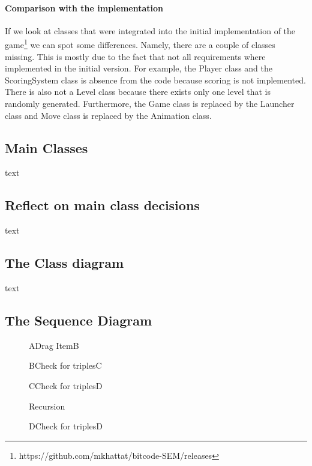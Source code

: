 \documentclass{article}
\begin{document}


\paragraph{Comparison with the implementation} If we look at classes that were integrated into the initial implementation of the game\footnote{https://github.com/mkhattat/bitcode-SEM/releases} we can spot some differences. Namely, there are a couple of classes missing. This is mostly due to the fact that not all requirements where implemented in the initial version. For example, the Player class and the ScoringSystem class is absence from the code because scoring is not implemented. There is also not a Level class because there exists only one level that is randomly generated. Furthermore, the Game class is replaced by the Launcher class and Move class is replaced by the Animation class.


\subsection{Main Classes}
text

\subsection{Reflect on main class decisions}
text

\subsection{The Class diagram}
text

\subsection{The Sequence Diagram}
	\begin{figure}[H]
		\centering
		\begin{sequencediagram}
			\begin{call}{A}{Drag Item}{B}{}
				\begin{call}{B}{Check for triples}{C}{}
					\begin{call}{C}{Check for triples}{D}{}
						\begin{sdblock}{Recursion}{}
							\begin{call}{D}{Check for triples}{D}{}
							\end{call}
						\end{sdblock}
					\end{call}
				\end{call}
			\end{call}
		\end{sequencediagram}
	\end{figure}
\end{document}
